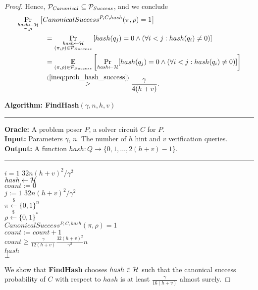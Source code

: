 \begin{proof}
Hence, $\mathcal{P}_{Canonical} \subseteq \mathcal{P}_{Success}$, and we conclude
\begin{align}
  \label{ineq:hash_high_prob}
&\underset{\substack{\textit{hash} \leftarrow \mathcal{H} \\ \pi, \rho}}{\Pr}\left[CanonicalSuccess^{P, C, hash}(\pi, \rho) = 1\right] \notag\\
&\mbox\qquad\qquad = \underset{\substack{\textit{hash} \leftarrow \mathcal{H} \\ (\pi, \rho) \in \mathcal{P}_{Success}}}{\Pr}\left[hash(q_j) = 0 \land (\forall i < j : hash(q_i) \neq 0)\right] \notag\\
&\mbox\qquad\qquad = \underset{{(\pi,\rho) \in \mathcal{P}_{Success}}}{\mathbb{E}}\left[\underset{\substack{\textit{hash} \leftarrow \mathcal{H}}}{\Pr}[hash(q_j) = 0 \land (\forall i < j : hash(q_i) \neq 0)]\right] \notag\\
&\mbox\qquad\qquad \stackrel{(\ref{ineq:prob_hash_success})}{\geq} \frac{\gamma}{4(h+v)}.
\end{align}
%
\begin{codeblock}
  \textbf{Algorithm: FindHash}$(\gamma, n, h, v)$
  \medskip
  \hrule
  \medskip
  \textbf{Oracle:} A problem poser $P$, a solver circuit $C$ for $P$.\\
  \textbf{Input:} Parameters $\gamma$, $n$. The number of $h$ hint and $v$ verification queries. \\
  \textbf{Output:} A function $hash:Q \rightarrow \{0,1, \dots, 2(h+v)-1 \}$.
  \medskip\hrule\medskip
  \For $i = 1$ \To $32n(h+v)^2/\gamma^2$ \Do \\
  \IndI $hash \leftarrow{} \mathcal{H}$ \\
  \IndI $count := 0$ \\
  \IndI \For $j := 1$ \To $32n(h+v)^2/\gamma^2$ \Do \\
  \IndII $\pi \xleftarrow{\$} \{0,1\}^{n} $\\
  \IndII $\rho \xleftarrow{\$} \{0,1\}^*$ \\
  \IndII \If $CanonicalSuccess^{P, C, hash}(\pi, \rho) = 1$ \Then \\
  \IndIII $count := count + 1$\\
  \IndI \If $count \geq \frac{\gamma}{12(h+v)} \frac{32(h+v)^2}{\gamma^2}n$ \Then \\
  \IndII \Return $hash$\\
  \Return $\bot$
\end{codeblock}
We show that \textbf{FindHash} chooses $hash \in \mathcal{H}$ such that the canonical success probability of $C$
with respect to $hash$ is at least $\frac{\gamma}{16(h+v)}$ almost surely.

\end{proof}
